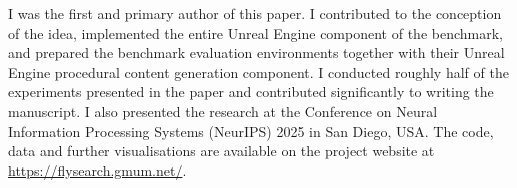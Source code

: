 I was the first and primary author of this paper. I contributed to the conception of the idea, implemented the entire Unreal Engine component of the benchmark, and prepared the benchmark evaluation environments together with their Unreal Engine procedural content generation component. I conducted roughly half of the experiments presented in the paper and contributed significantly to writing the manuscript. I also presented the research at the Conference on Neural Information Processing Systems (NeurIPS) 2025 in San Diego, USA. The code, data and further visualisations are available on the project website at \url{https://flysearch.gmum.net/}.
